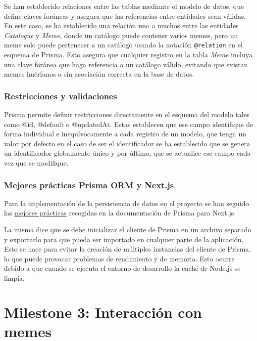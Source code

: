 Se han establecido relaciones entre las tablas mediante el modelo de datos, que define claves foráneas y asegura que las referencias entre entidades sean válidas. En este caso, se ha establecido una relación uno a muchos entre las entidades \textit{Catalogue} y \textit{Meme}, donde un catálogo puede contener varios memes, pero un meme solo puede pertenecer a un catálogo usando la notación \texttt{@relation} en el esquema de Prisma. Esto asegura que cualquier registro en la tabla \textit{Meme} incluya una clave foránea que haga referencia a un catálogo válido, evitando que existan memes huérfanos o sin asociación correcta en la base de datos.

\subsubsection{Restricciones y validaciones}

Prisma permite definir restricciones directamente en el esquema del modelo tales como @id, @default o @updatedAt. Estas establecen que ese campo identifique de forma individual e inequívocamente a cada registro de un modelo, que tenga un valor por defecto en el caso de ser el identificador se ha establecido que se genera un identificador globalmente único y por último, que se actualice ese campo cada vez que se modifique.

\subsubsection{Mejores prácticas Prisma ORM y Next.js}

Para la implementación de la persistencia de datos en el proyecto se han seguido las \href{https://www.prisma.io/docs/orm/more/help-and-troubleshooting/help-articles/nextjs-prisma-client-dev-practices}{mejores prácticas} recogidas en la documentación de Prisma para Next.js.

La misma dice que se debe inicializar el cliente de Prisma en un archivo separado y exportarlo para que pueda ser importado en cualquier parte de la aplicación. Esto se hace para evitar la creación de múltiples instancias del cliente de Prisma, lo que puede provocar problemas de rendimiento y de memoria. Esto ocurre debido a que cuando se ejecuta el entorno de desarrollo la caché de Node.js se limpia.

\section{Milestone 3: Interacción con memes}

